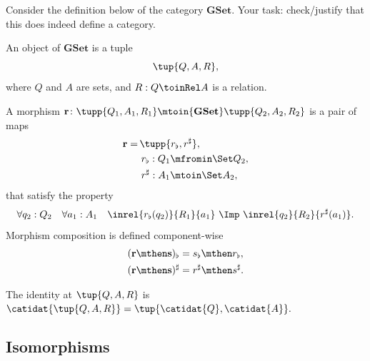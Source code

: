 \begin{gradedexercise}
    \label{ex:HwkGSet}

    Consider the definition below of the category $\mathbf{GSet}$.
    Your task: check/justify that this does indeed define a category.

    \begin{ctdefinition}[GC]\label{def:GC-definition}
        An object of $\mathbf{GSet}$ is a tuple
        \begin{equation}
            \tup{Q, A, R},
        \end{equation}
        where $Q$ and $A$ are sets, and $R : Q \toinRel A$ is a relation.

        A morphism
        $
            \mathbf{r} \colon \tupp{Q_1, A_1, R_1}
            \mtoin{\mathbf{GSet}}
            \tupp{Q_2, A_2, R_2}
        $
        is a pair of maps
        \begin{align}
            \mathbf{r} = & \,\tupp{r_\flat, r^\sharp}, \\
                         & \ r_\flat: Q_1 \mfromin\Set Q_2, \\
                         & \ r^\sharp: A_1 \mtoin\Set A_2,
        \end{align}
        that satisfy the property
        \begin{equation}\label{eq:gset-mor-cond}
            \forall q_2: Q_2 \quad \forall a_1: A_1 \quad
            \inrel{r_\flat(q_2)}{R_1}{a_1}
            \ \Imp\
            \inrel{q_2}{R_2}{r^\sharp(a_1)}.
        \end{equation}
        Morphism composition is defined component-wise
        \begin{align}
            ( \mathbf{r} \mthen \mathbf{s} )_\flat  & = s_\flat \mthen r_\flat, \\
            ( \mathbf{r} \mthen \mathbf{s} )^\sharp & = r^\sharp \mthen s^\sharp.
        \end{align}

        The identity at $\tup{Q, A, R}$ is
        $
            \catidat{\tup{Q, A, R}} =
            \tup{
                \catidat{Q}, \catidat{A}
            }.
        $
    \end{ctdefinition}
\end{gradedexercise}


\subsection{Isomorphisms}

